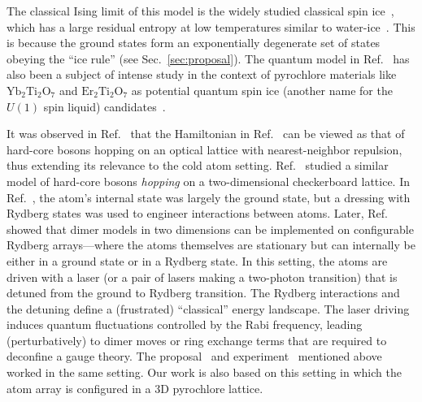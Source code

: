 \documentclass[twocolumn,superscriptaddress,amsmath,amssymb,aps,prx,nofootinbib]{revtex4-2}
\begin{document}
The classical Ising limit of this model is the widely studied classical spin ice~\cite{bramwell2020history,gingras2011spin,udagawa2021spin,skjaervo2020advances,nisoli2013colloquium}, which has a large residual entropy at low temperatures similar to water-ice~\cite{pauling1935}. This is because the ground states form an exponentially degenerate set of states obeying the ``ice rule'' (see Sec.~\ref{sec:proposal}). The quantum model in Ref.~\cite{hermele2004} has also been a subject of intense study in the context of pyrochlore materials like $\text{Yb}_2\text{Ti}_2\text{O}_7$ and $\text{Er}_2\text{Ti}_2\text{O}_7$ as potential quantum spin ice (another name for the $U(1)$ spin liquid) candidates~\cite{gingras2014quantum}. 

It was observed in Ref.~\cite{tewari2006emergence} that the Hamiltonian in Ref.~\cite{hermele2004} can be viewed as that of hard-core bosons hopping on an optical lattice with nearest-neighbor repulsion, thus extending its relevance to the cold atom setting. Ref.~\cite{glaetzle2014quantum} studied a similar model of hard-core bosons \textit{hopping} on a two-dimensional checkerboard lattice. In Ref.~\cite{glaetzle2014quantum}, the atom's internal state was largely the ground state, but a dressing with Rydberg states was used to engineer interactions between atoms. Later, Ref.~\cite{celi2020emerging} showed that dimer models in two dimensions can be implemented on configurable Rydberg arrays---where the atoms themselves are stationary but can internally be either in a ground state or in a Rydberg state. In this setting, the atoms are driven with a laser (or a pair of lasers making a two-photon transition) that is detuned from the ground to Rydberg transition. The Rydberg interactions and the detuning define a (frustrated) ``classical'' energy landscape. The laser driving induces quantum fluctuations controlled by the Rabi frequency, leading (perturbatively) to dimer moves or ring exchange terms that are required to deconfine a gauge theory. The proposal~\cite{verresen2021} and experiment~\cite{semeghini2021} mentioned above worked in the same setting. Our work is also based on this setting in which the atom array is configured in a 3D pyrochlore lattice.
\end{document}
